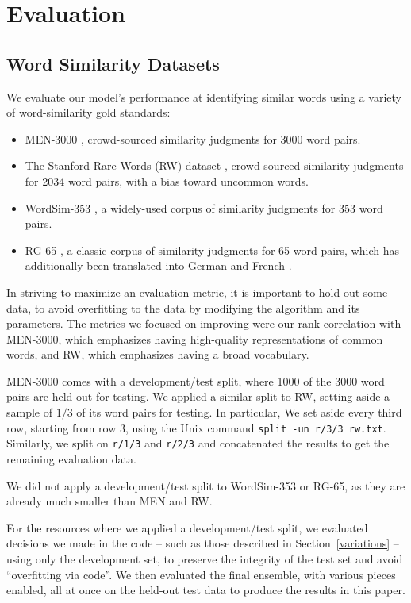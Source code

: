 \documentclass[11pt,letterpaper]{article}
\begin{document}
\section{Evaluation}

\subsection{Word Similarity Datasets}

We evaluate our model's performance at identifying similar words using a
variety of word-similarity gold standards:

\begin{itemize}
\item MEN-3000 \cite{bruni2014men}, crowd-sourced similarity judgments for 3000
    word pairs.
\item The Stanford Rare Words (RW) dataset \cite{luong2013rw}, crowd-sourced
    similarity judgments for 2034 word pairs, with a bias toward uncommon words.
\item WordSim-353 \cite{finkelstein2001ws}, a widely-used corpus of similarity
    judgments for 353 word pairs.
\item RG-65 \cite{rubenstein1965rg}, a classic corpus of similarity judgments
    for 65 word pairs, which has additionally been translated into German
    \cite{gurevych2005german} and French \cite{joubarne2011french}.
\end{itemize}

In striving to maximize an evaluation metric, it is important to hold out some
data, to avoid overfitting to the data by modifying the algorithm and its
parameters. The metrics we focused on improving were our rank correlation with
MEN-3000, which emphasizes having high-quality representations of common words,
and RW, which emphasizes having a broad vocabulary.

MEN-3000 comes with a development/test split, where 1000 of the 3000 word pairs
are held out for testing. We applied a similar split to RW, setting aside a
sample of $1/3$ of its word pairs for testing. In particular, We set aside
every third row, starting from row 3, using the Unix command {\tt split -un
r/3/3 rw.txt}. Similarly, we split on {\tt r/1/3} and {\tt r/2/3} and
concatenated the results to get the remaining evaluation data.

We did not apply a development/test split to WordSim-353 or RG-65, as they are
already much smaller than MEN and RW.

For the resources where we applied a development/test split, we evaluated
decisions we made in the code -- such as those described in
Section~\ref{variations} -- using only the development set, to preserve the
integrity of the test set and avoid ``overfitting via code''. We then evaluated
the final ensemble, with various pieces enabled, all at once on the held-out
test data to produce the results in this paper.
\end{document}
